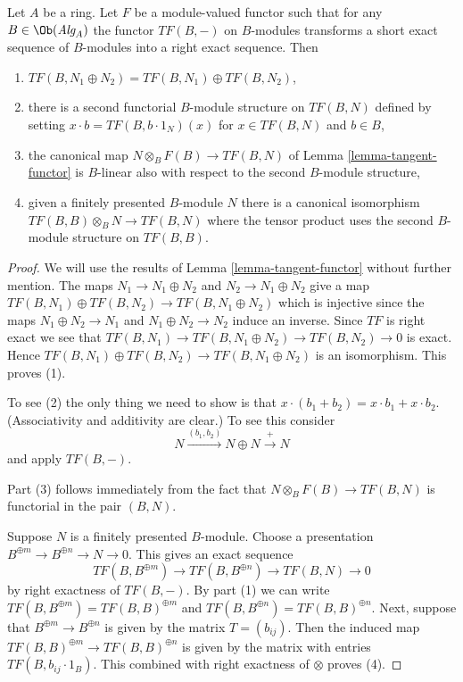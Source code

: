 \begin{lemma}
\label{lemma-exactness-implies}
Let $A$ be a ring. Let $F$ be a module-valued functor
such that for any $B \in \Ob(\textit{Alg}_A)$ the
functor $TF(B, -)$ on $B$-modules transforms a short exact sequence
of $B$-modules into a right exact sequence. Then
\begin{enumerate}
\item $TF(B, N_1 \oplus N_2) = TF(B, N_1) \oplus TF(B, N_2)$,
\item there is a second functorial $B$-module structure on $TF(B, N)$
defined by setting $x \cdot b = TF(B, b\cdot 1_N)(x)$ for $x \in TF(B, N)$
and $b \in B$,
\item
\label{item-mult-map-linear}
the canonical map $N \otimes_B F(B) \to TF(B, N)$ of
Lemma \ref{lemma-tangent-functor}
is $B$-linear also with respect to the second $B$-module structure,
\item
\label{item-tangent-right-exact}
given a finitely presented $B$-module $N$ there is a canonical
isomorphism $TF(B, B) \otimes_B N \to TF(B, N)$ where the tensor
product uses the second $B$-module structure on $TF(B, B)$.
\end{enumerate}
\end{lemma}

\begin{proof}
We will use the results of
Lemma \ref{lemma-tangent-functor}
without further mention.
The maps $N_1 \to N_1 \oplus N_2$ and $N_2 \to N_1 \oplus N_2$ give
a map $TF(B, N_1) \oplus TF(B, N_2) \to TF(B, N_1 \oplus N_2)$
which is injective since the maps $N_1 \oplus N_2 \to N_1$ and
$N_1 \oplus N_2 \to N_2$ induce an inverse.
Since $TF$ is right exact we see that
$TF(B, N_1) \to TF(B, N_1 \oplus N_2) \to TF(B, N_2) \to 0$ is exact.
Hence $TF(B, N_1) \oplus TF(B, N_2) \to TF(B, N_1 \oplus N_2)$ is an
isomorphism. This proves (1).

\medskip\noindent
To see (2) the only thing we need to show is that
$x \cdot (b_1 + b_2) = x \cdot b_1 + x \cdot b_2$.
(Associativity and additivity are clear.) To see this consider
$$
N \xrightarrow{(b_1, b_2)} N \oplus N \xrightarrow{+} N
$$
and apply $TF(B, -)$.

\medskip\noindent
Part (3) follows immediately from the fact that
$N \otimes_B F(B) \to TF(B, N)$ is functorial in the pair $(B, N)$.

\medskip\noindent
Suppose $N$ is a finitely presented $B$-module. Choose a presentation
$B^{\oplus m} \to B^{\oplus n} \to N \to 0$. This gives an exact
sequence
$$
TF(B, B^{\oplus m}) \to TF(B, B^{\oplus n}) \to TF(B, N) \to 0
$$
by right exactness of $TF(B, -)$. By part (1) we can write
$TF(B, B^{\oplus m}) = TF(B, B)^{\oplus m}$ and
$TF(B, B^{\oplus n}) = TF(B, B)^{\oplus n}$. Next, suppose that
$B^{\oplus m} \to B^{\oplus n}$ is given by the matrix $T = (b_{ij})$.
Then the induced map $TF(B, B)^{\oplus m} \to TF(B, B)^{\oplus n}$
is given by the matrix with entries $TF(B, b_{ij} \cdot 1_B)$.
This combined with right exactness of $\otimes$ proves (4).
\end{proof}


